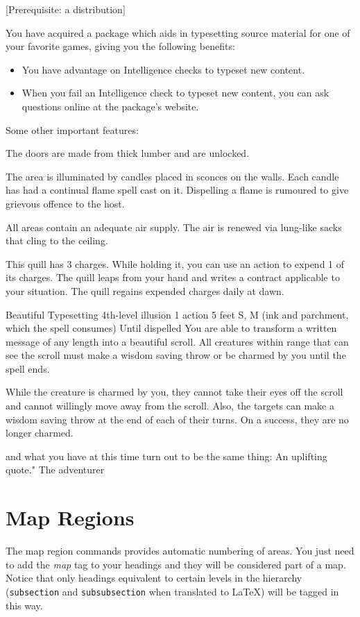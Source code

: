 \documentclass[10pt,twoside,twocolumn,openany,bg=full,notitlepage,nodeprecatedcode]{dndarticle}
\begin{document}
[Prerequisite: a distribution]
{You have acquired a package which aids in typesetting source material for one of your favorite games, giving you the
following benefits:
\begin{itemize}
\item You have advantage on Intelligence checks to typeset new content.
\item When you fail an Intelligence check to typeset new content, you can ask questions online at the package’s website.
\end{itemize}
Some other important features:
\begin{description}[nosep, after = { \vspace{4pt plus 1pt minus 1pt} }]
\item[Doors:] The doors are made from thick lumber and are unlocked.
\item[Light:] The area is illuminated by candles placed in sconces on the walls. Each candle has had a continual flame spell cast on it. Dispelling a flame is rumoured to give grievous offence to the host.
\item[Ventilation:] All areas contain an adequate air supply. The air is renewed via lung-like sacks that cling to the ceiling.
\end{description}}

This quill has 3 charges. While holding it, you can use an action to expend 1 of its charges. The quill leaps from your
hand and writes a contract applicable to your situation.
The quill regains  expended charges daily at dawn.

\DndSpellHeader%
{Beautiful Typesetting}
{4th-level illusion}
{1 action}
{5 feet}
{S, M (ink and parchment, which the spell consumes)}
{Until dispelled}
You are able to transform a written message of any length into a beautiful
scroll. All creatures within range that can see the scroll must make a wisdom
saving throw or be charmed by you until the spell ends.

While the creature is charmed by you, they cannot take their eyes off the
scroll and cannot willingly move away from the scroll. Also, the targets can
make a wisdom saving throw at the end of each of their turns. On a success,
they are no longer charmed.

{and what you have at this time turn out to be the same thing: An uplifting quote."}
{The adventurer}
\section{Map Regions}
\label{sec:org89df3e3}
The map region commands provides automatic numbering of areas. You just need to add the \emph{map} tag to your headings and they will be considered part of a map. Notice that only headings equivalent to certain levels in the hierarchy (\texttt{subsection} and \texttt{subsubsection} when translated to \LaTeX) will be tagged in this way.
\end{document}
